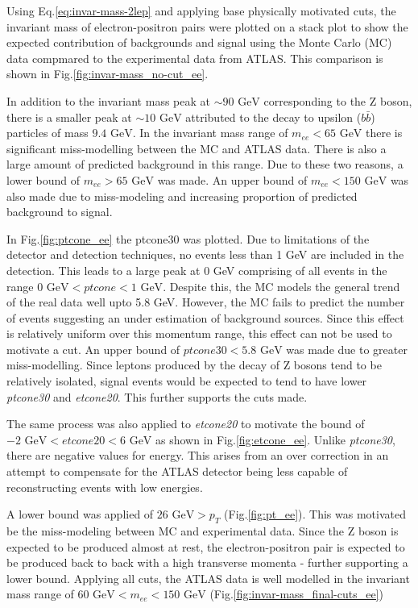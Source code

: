 \documentclass[%
 reprint,
 amsmath,amssymb,
 aps,
]{revtex4-2}
\begin{document}
Using Eq.\ref{eq:invar-mass-2lep} and applying base physically motivated cuts, the invariant mass of electron-positron pairs were plotted on a stack plot to show the expected contribution of backgrounds and signal using the Monte Carlo (MC) data compmared to the experimental data from ATLAS.  This comparison is shown in Fig.\ref{fig:invar-mass_no-cut_ee}.

In addition to the invariant mass peak at $\sim 90 \text{ GeV}$ corresponding to the Z boson, there is a smaller peak at $\sim 10 \text{ GeV}$ attributed to the decay to upsilon ($b\bar{b}$) particles of mass $9.4 \text{ GeV}$\cite{10.2307-24955824}.
In the invariant mass range of $m_{ee} < 65 \text{ GeV}$ there is significant miss-modelling between the MC and ATLAS data. There is also a large amount of predicted background in this range.  Due to these two reasons, a lower bound of $m_{ee} > 65 \text{ GeV}$ was made. An upper bound of $m_{ee} < 150 \text{ GeV}$ was also made due to miss-modeling and increasing proportion of predicted background to signal.

In Fig.\ref{fig:ptcone_ee} the ptcone30 was plotted.  Due to limitations of the detector and detection techniques, no events less than 1 GeV are included in the detection.  This leads to a large peak at 0 GeV comprising of all events in the range $0 \text{ GeV} < ptcone < 1 \text{ GeV}$. Despite this, the MC models the general trend of the real data well upto 5.8 GeV.  However, the MC fails to predict the number of events suggesting an under estimation of background sources.  Since this effect is relatively uniform over this momentum range, this effect can not be used to motivate a cut. An upper bound of $ptcone30 < 5.8 \text{ GeV}$ was made due to greater miss-modelling. Since leptons produced by the decay of Z bosons tend to be relatively isolated, signal events would be expected to tend to have lower \textit{ptcone30} and \textit{etcone20}.   This further supports the cuts made.

The same process was also applied to \textit{etcone20} to motivate the bound of $-2 \text{ GeV} < etcone20 < 6 \text{ GeV}$ as shown in Fig.\ref{fig:etcone_ee}. Unlike \textit{ptcone30}, there are negative values for energy.  This arises from an over correction in an attempt to compensate for the ATLAS detector being less capable of reconstructing events with low energies. 

A lower bound was applied of $26 \text{ GeV} > p_T$ (Fig.\ref{fig:pt_ee}).  This was motivated be the miss-modeling between MC and experimental data.  Since the Z boson is expected to be produced almost at rest, the electron-positron pair is expected to be produced back to back with a high transverse momenta - further supporting a lower bound. Applying all cuts, the ATLAS data is well modelled in the invariant mass range of $60 \text{ GeV} < m_{ee} < 150 \text{ GeV}$ (Fig.\ref{fig:invar-mass_final-cuts_ee})
\end{document}
